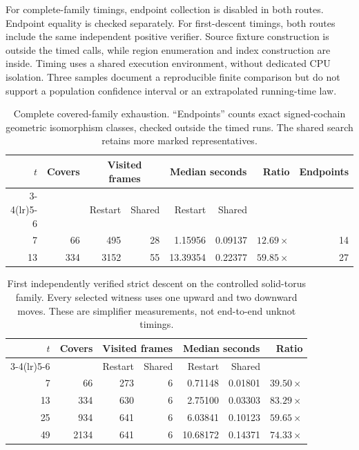 For complete-family timings, endpoint collection is disabled in both
routes. Endpoint equality is checked separately. For first-descent timings,
both routes include the same independent positive verifier. Source fixture
construction is outside the timed calls, while region enumeration and
index construction are inside. Timing uses a shared execution environment,
without dedicated CPU isolation. Three samples document a reproducible
finite comparison but do not support a population confidence interval or
an extrapolated running-time law.

\begin{table}[ht]
\centering\small
\begin{tabular}{@{}rrrrrrrr@{}}
\toprule
$t$ & Covers & \multicolumn{2}{c}{Visited frames} &
\multicolumn{2}{c}{Median seconds} & Ratio & Endpoints\\
\cmidrule(lr){3-4}\cmidrule(lr){5-6}
& & Restart & Shared & Restart & Shared & & \\
\midrule
7  & 66  & 495  & 28 & 1.15956  & 0.09137 & $12.69\times$ & 14\\
13 & 334 & 3152 & 55 & 13.39354 & 0.22377 & $59.85\times$ & 27\\
\bottomrule
\end{tabular}
\caption{Complete covered-family exhaustion. ``Endpoints'' counts exact
signed-cochain geometric isomorphism classes, checked outside the timed
runs. The shared search retains more marked representatives.}
\label{tab:exhaustion}
\end{table}

\begin{table}[ht]
\centering\small
\begin{tabular}{@{}rrrrrrr@{}}
\toprule
$t$ & Covers & \multicolumn{2}{c}{Visited frames} &
\multicolumn{2}{c}{Median seconds} & Ratio\\
\cmidrule(lr){3-4}\cmidrule(lr){5-6}
& & Restart & Shared & Restart & Shared & \\
\midrule
7  & 66   & 273 & 6 & 0.71148  & 0.01801 & $39.50\times$\\
13 & 334  & 630 & 6 & 2.75100  & 0.03303 & $83.29\times$\\
25 & 934  & 641 & 6 & 6.03841  & 0.10123 & $59.65\times$\\
49 & 2134 & 641 & 6 & 10.68172 & 0.14371 & $74.33\times$\\
\bottomrule
\end{tabular}
\caption{First independently verified strict descent on the controlled
solid-torus family. Every selected witness uses one upward and two downward
moves. These are simplifier measurements, not end-to-end unknot timings.}
\label{tab:descent}
\end{table}

